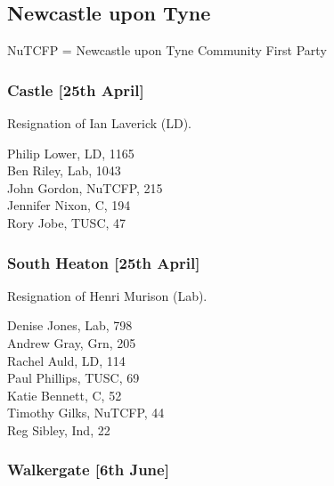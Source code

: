 \documentclass[a4paper,openany,10pt]{book}
\begin{document}
\subsection*{Newcastle upon Tyne}

NuTCFP = Newcastle upon Tyne Community First Party

\subsubsection*{Castle \hspace*{\fill}\nolinebreak[1]%
\enspace\hspace*{\fill}
[25th April]}


Resignation of Ian Laverick (LD).



Philip Lower, LD, 1165\\
Ben Riley, Lab, 1043\\
John Gordon, NuTCFP, 215\\
Jennifer Nixon, C, 194\\
Rory Jobe, TUSC, 47\\


\subsubsection*{South Heaton \hspace*{\fill}\nolinebreak[1]%
\enspace\hspace*{\fill}
[25th April]}


Resignation of Henri Murison (Lab).



Denise Jones, Lab, 798\\
Andrew Gray, Grn, 205\\
Rachel Auld, LD, 114\\
Paul Phillips, TUSC, 69\\
Katie Bennett, C, 52\\
Timothy Gilks, NuTCFP, 44\\
Reg Sibley, Ind, 22\\


\subsubsection*{Walkergate \hspace*{\fill}\nolinebreak[1]%
\enspace\hspace*{\fill}
[6th June]}
\end{document}
